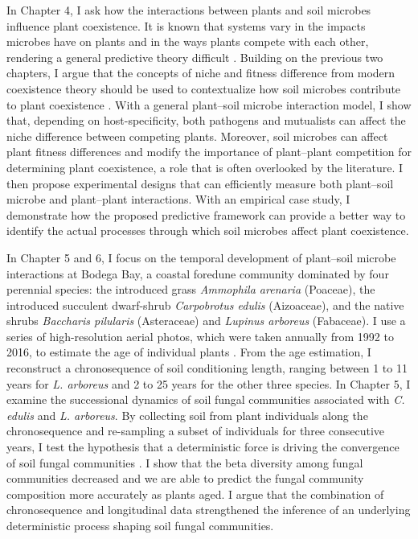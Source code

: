 In Chapter 4, I ask how the interactions between plants and soil microbes influence plant coexistence. It is known that systems vary in the impacts microbes have on plants and in the ways plants compete with each other, rendering a general predictive theory difficult \citep{Lekberg2018}. Building on the previous two chapters, I argue that the concepts of niche and fitness difference from modern coexistence theory should be used to contextualize how soil microbes contribute to plant coexistence \citep{KeMiki2015}. 
With a general plant--soil microbe interaction model, I show that, depending on host-specificity, both pathogens and mutualists can affect the niche difference between competing plants. Moreover, soil microbes can affect plant fitness differences and modify the importance of plant--plant competition for determining plant coexistence, a role that is often overlooked by the literature. I then propose experimental designs that can efficiently measure both plant--soil microbe and plant--plant interactions. With an empirical case study, I demonstrate how the proposed predictive framework can provide a better way to identify the actual processes through which soil microbes affect plant coexistence.
\par


In Chapter 5 and 6, I focus on the temporal development of plant--soil microbe interactions at Bodega Bay, a coastal foredune community dominated by four perennial species: the introduced grass \textit{Ammophila arenaria} (Poaceae), the introduced succulent dwarf-shrub \textit{Carpobrotus edulis} (Aizoaceae), and the native shrubs \textit{Baccharis pilularis} (Asteraceae) and \textit{Lupinus arboreus} (Fabaceae). I use a series of high-resolution aerial photos, which were taken annually from 1992 to 2016, to estimate the age of individual plants \citep{Danin1998}. From the age estimation, I reconstruct a chronosequence of soil conditioning length, ranging between 1 to 11 years for \textit{L. arboreus} and 2 to 25 years for the other three species.
In Chapter 5, I examine the successional dynamics of soil fungal communities associated with \textit{C. edulis} and \textit{L. arboreus}. By collecting soil from plant individuals along the chronosequence and re-sampling a subset of individuals for three consecutive years, I test the hypothesis that a deterministic force is driving the convergence of soil fungal communities \citep{Connell1977, DiniAndreote2015, Li2016}. 
I show that the beta diversity among fungal communities decreased and we are able to predict the fungal community composition more accurately as plants aged. I argue that the combination of chronosequence and longitudinal data strengthened the inference of an underlying deterministic process shaping soil fungal communities.
\par 


